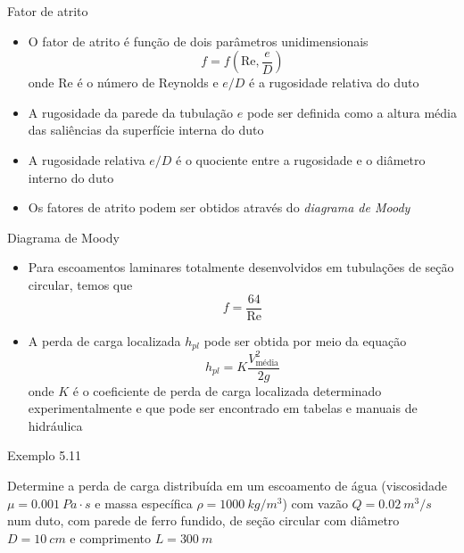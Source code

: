 \documentclass[t,%
brazilian,%
11pt,%
aspectratio=169,%
table%
]{beamer}
\begin{document}
\begin{frame}{Fator de atrito}
    \begin{itemize}
        \item O fator de atrito é função de dois parâmetros unidimensionais
            \[
                f=f\left(\text{Re},\frac{e}{D}\right)
            \]
            onde Re é o número de Reynolds e \(e/D\) é a rugosidade relativa do duto
        \item A rugosidade da parede da tubulação \(e\) pode ser definida como a
            altura média das saliências da superfície interna do duto
        \item A rugosidade relativa \(e/D\) é o quociente entre a rugosidade e o diâmetro
            interno do duto

        \item Os fatores de atrito podem ser obtidos através do \textit{diagrama de Moody}
    \end{itemize}
\end{frame}

\begin{frame}{Diagrama de Moody}
    \centering
    \def\svgwidth{\textwidth-100pt}
    
\end{frame}

\begin{frame}{}
    \begin{itemize} 
        \item Para escoamentos laminares totalmente desenvolvidos em tubulações
            de seção circular, temos que
            \[
                f=\frac{64}{\text{Re}}
            \]
        \item A perda de carga localizada \(h_{pl}\) pode ser obtida por meio da equação
            \[
                h_{pl} = K\frac{V_\text{média}^2}{2g}
            \]
            onde \(K\) é o coeficiente de perda de carga localizada determinado
            experimentalmente e que pode ser encontrado em tabelas e manuais de 
            hidráulica
    \end{itemize}
\end{frame}

\begin{frame}{Exemplo 5.11}
    \begin{minipage}{\textwidth}
        Determine a perda de carga distribuída em um escoamento de água
        (viscosidade \(\mu = \SI{0.001}{Pa\cdot s}\) e massa específica 
        \(\rho = \SI{1000}{kg/m^3}\)) com vazão \(Q= \SI{0.02}{m^3/s}\) num duto,
        com parede de ferro fundido, de seção circular com diâmetro \(D= \SI{10}{cm}\)
        e comprimento \(L=\SI{300}{m}\)
    \end{minipage}
\end{frame}
\end{document}

